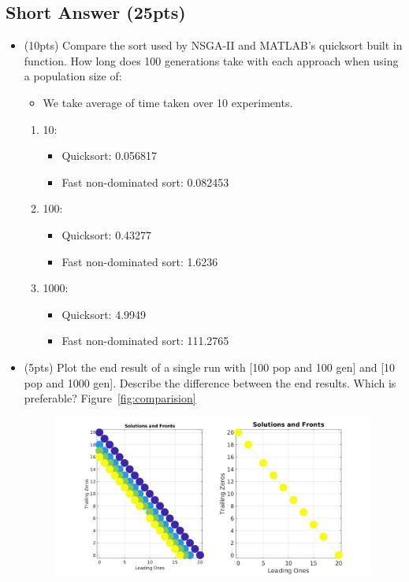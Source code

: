 \documentclass{article}
\begin{document}
\subsection{Short Answer (25pts)}
\begin{itemize}
	\item (10pts) Compare the sort used by NSGA-II and MATLAB's quicksort built in  function. How long does 100 generations take with each approach when using a population size of:
        \begin{itemize}
        \color{blue}
            \item We take average of time taken over 10 experiments.
        \color{black}
        \end{itemize}
	\begin{enumerate}
		\item 10:
			\begin{itemize}
                \item Quicksort: \color{blue}0.056817\color{black}
			\item Fast non-dominated sort: \color{blue}0.082453\color{black}
			\end{itemize}
		\item 100:
			\begin{itemize}
			\item Quicksort: \color{blue}0.43277\color{black}
			\item Fast non-dominated sort: \color{blue}1.6236\color{black}
			\end{itemize}
		\item 1000:
			\begin{itemize}
			\item Quicksort: \color{blue}4.9949\color{black}
			\item Fast non-dominated sort: \color{blue}111.2765\color{black}
			\end{itemize}
	\end{enumerate}
	\item (5pts) Plot the end result of a single run with [100 pop and 100 gen] and [10 pop and 1000 gen]. Describe the difference between the end results. Which is preferable?
        \color{blue}
        Figure~\ref{fig:comparision}
        \color{black}
        \begin{figure}[htpb]
            \centering
            \includegraphics[width=1.0\linewidth]{section3point2_comparision.jpg}

\end{figure}
\end{itemize}
\end{document}
